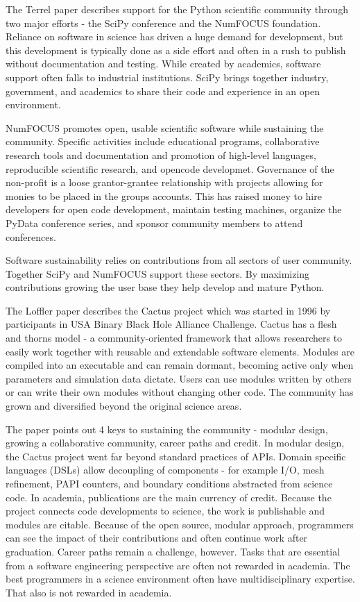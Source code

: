 \documentclass[11pt, oneside]{amsart}
\begin{document}
The Terrel paper describes support for the Python scientific community through two major efforts - the SciPy conference and the
NumFOCUS foundation. Reliance on software in science has driven a huge demand for development, but this development is typically done as a side effort
and often in a rush to publish without documentation and testing.
While created by academics, software support often falls to industrial institutions. SciPy brings together industry, government, 
and academics to share their code and experience in an open environment. 

NumFOCUS promotes open, usable scientific software while sustaining the community. Specific activities include educational programs, 
collaborative research tools and documentation and 
promotion of high­-level languages, reproducible scientific research, and open­code developmet.
Governance of the non-profit is a loose grantor-­grantee relationship with projects allowing for monies to be placed in the groups accounts.
This has raised money to hire developers for open code development, maintain testing machines, organize the PyData conference series, and sponsor community members to attend conferences.

Software sustainability relies on contributions from all sectors of user community. Together SciPy and NumFOCUS support these sectors. By maximizing contributions growing the user base they help develop and mature Python.

The Loffler paper describes the Cactus project which was started in 1996 by participants in USA Binary Black Hole Alliance 
Challenge. Cactus has a flesh and thorns model - a community-oriented framework that allows researchers to easily work 
together with reusable and extendable software elements. Modules are compiled into an executable and can remain dormant, becoming
active only when parameters and simulation data dictate. Users can  use modules written by others or can write their own 
modules without changing other code. The community has grown and diversified beyond the original science areas.

The paper points out 4 keys to sustaining the community - modular design, growing a collaborative community, career paths and credit.
In modular design, the Cactus project went far beyond standard practices of APIs. 
Domain specific languages (DSLs) allow decoupling of components - for example I/O, mesh refinement, PAPI counters, and
boundary conditions abstracted from science code. In academia, publications are the main currency of credit. Because the 
project connects code developments to science, the work is 
publishable and modules are citable. Because of the open source, modular approach, programmers can see the impact of their contributions and often continue
work after graduation. Career paths remain a challenge, however. Tasks that are essential from a software engineering perspective
are often not rewarded in academia. The best programmers in a science environment often have multidisciplinary expertise.
That also is not rewarded in academia.
\end{document}
